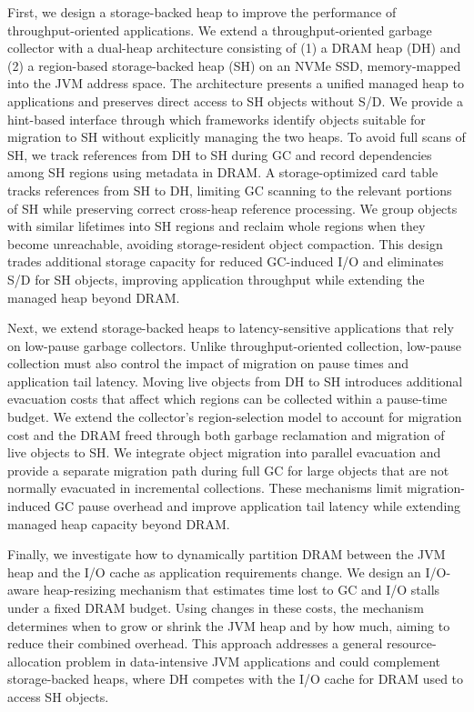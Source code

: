 First, we design a storage-backed heap to improve the performance of throughput-oriented applications.
We extend a throughput-oriented garbage collector with a dual-heap architecture consisting of (1) a DRAM heap (DH) and (2) a region-based storage-backed heap (SH) on an NVMe SSD, memory-mapped into the JVM address space.
The architecture presents a unified managed heap to applications and preserves direct access to SH objects without S/D.
We provide a hint-based interface through which frameworks identify objects suitable for migration to SH without explicitly managing the two heaps.
To avoid full scans of SH, we track references from DH to SH during GC and record dependencies among SH regions using metadata in DRAM.
A storage-optimized card table tracks references from SH to DH, limiting GC scanning to the relevant portions of SH while preserving correct cross-heap reference processing.
We group objects with similar lifetimes into SH regions and reclaim whole regions when they become unreachable, avoiding storage-resident object compaction.
This design trades additional storage capacity for reduced GC-induced I/O and eliminates S/D for SH objects, improving application throughput while extending the managed heap beyond DRAM.

Next, we extend storage-backed heaps to latency-sensitive applications that rely on low-pause garbage collectors.
Unlike throughput-oriented collection, low-pause collection must also control the impact of migration on pause times and application tail latency.
Moving live objects from DH to SH introduces additional evacuation costs that affect which regions can be collected within a pause-time budget.
We extend the collector's region-selection model to account for migration cost and the DRAM freed through both garbage reclamation and migration of live objects to SH.
We integrate object migration into parallel evacuation and provide a separate migration path during full GC for large objects that are not normally evacuated in incremental collections.
These mechanisms limit migration-induced GC pause overhead and improve application tail latency while extending managed heap capacity beyond DRAM.

Finally, we investigate how to dynamically partition DRAM between the JVM heap and the I/O cache as application requirements change.
We design an I/O-aware heap-resizing mechanism that estimates time lost to GC and I/O stalls under a fixed DRAM budget.
Using changes in these costs, the mechanism determines when to grow or shrink the JVM heap and by how much, aiming to reduce their combined overhead.
This approach addresses a general resource-allocation problem in data-intensive JVM applications and could complement storage-backed heaps, where DH competes with the I/O cache for DRAM used to access SH objects.

